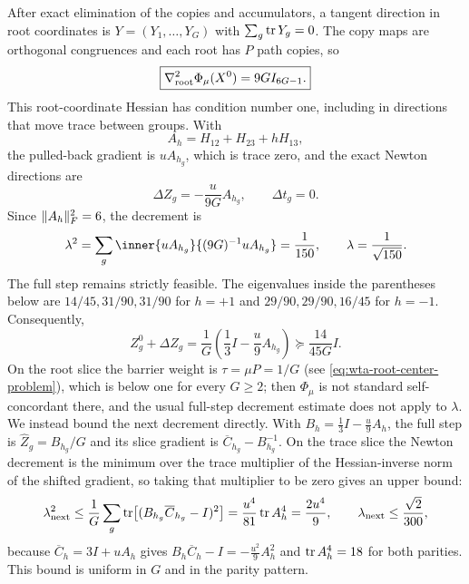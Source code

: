 After exact elimination of the copies and accumulators, a tangent
direction in root coordinates is $Y=(Y_1,\ldots,Y_G)$ with
$\sum_g\operatorname{tr} Y_g=0$.  The copy maps are orthogonal congruences and each root
has $P$ path copies, so
\begin{equation}
 \boxed{\nabla^2_{\rm root}\Phi_\mu(X^0)=9G I_{6G-1}.}
 \label{eq:wta-root-hessian}
\end{equation}
This root-coordinate Hessian has condition number one, including in
directions that move trace between groups.  With
\begin{equation}
 A_h=H_{12}+H_{23}+hH_{13},
 \label{eq:wta-Ah}
\end{equation}
the pulled-back gradient is $uA_{h_g}$, which is trace zero, and the exact
Newton directions are
\begin{equation}
 \Delta Z_g=-\frac{u}{9G}A_{h_g},\qquad \Delta t_g=0.
 \label{eq:wta-newton-direction}
\end{equation}
Since $\lVert A_h\rVert_F^2=6$, the decrement is
\begin{equation}
 \lambda^2=\sum_g\inner{uA_{h_g}}{(9G)^{-1}uA_{h_g}}
 =\frac1{150},\qquad \lambda=\frac1{\sqrt{150}}.
 \label{eq:wta-decrement}
\end{equation}
The full step remains strictly feasible.  The eigenvalues inside the
parentheses below are $14/45,31/90,31/90$ for $h=+1$ and
$29/90,29/90,16/45$ for $h=-1$.  Consequently,
\begin{equation}
 Z_g^0+\Delta Z_g=\frac1G\left(\frac13I-\frac u9A_{h_g}\right)
 \succeq\frac{14}{45G}I.
 \label{eq:wta-full-step-margin}
\end{equation}
On the root slice the barrier weight is $\tau=\mu P=1/G$ (see
\eqref{eq:wta-root-center-problem}), which is below one for every $G\ge2$;
then $\Phi_\mu$ is not standard self-concordant there, and the usual
full-step decrement estimate does not apply to $\lambda$.  We instead bound the next
decrement directly.  With
$B_h=\tfrac13I-\tfrac u9A_h$, the full step is $\widehat Z_g=B_{h_g}/G$ and
its slice gradient is $\overline C_{h_g}-B_{h_g}^{-1}$.  On the trace slice
the Newton decrement is the minimum over the trace multiplier of the
Hessian-inverse norm of the shifted gradient, so taking that multiplier to
be zero gives an upper bound:
\begin{equation}
 \lambda_{\rm next}^2
 \le\frac1G\sum_g\operatorname{tr}\bigl[(B_{h_g}\overline C_{h_g}-I)^2\bigr]
 =\frac{u^4}{81}\operatorname{tr} A_h^4=\frac{2u^4}{9},
 \qquad
 \lambda_{\rm next}\le\frac{\sqrt2}{300},
 \label{eq:wta-next-decrement}
\end{equation}
because $\overline C_h=3I+uA_h$ gives
$B_h\overline C_h-I=-\tfrac{u^2}9A_h^2$ and $\operatorname{tr} A_h^4=18$ for both
parities.  This bound is uniform in $G$ and in the parity pattern.


